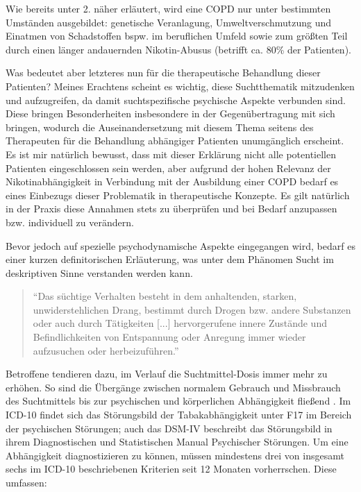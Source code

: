 Wie bereits unter 2. näher erläutert, wird eine COPD nur unter bestimmten Umständen ausgebildet: genetische Veranlagung, Umweltverschmutzung und Einatmen von Schadstoffen bspw. im beruflichen Umfeld sowie zum größten Teil durch einen länger andauernden Nikotin-Abusus (betrifft ca. 80\% der Patienten). 

Was bedeutet aber letzteres nun für die therapeutische Behandlung dieser Patienten? Meines Erachtens scheint es wichtig, diese Suchtthematik mitzudenken und aufzugreifen, da damit suchtspezifische psychische Aspekte verbunden sind. Diese bringen Besonderheiten insbesondere in der Gegenübertragung mit sich bringen, wodurch die Auseinandersetzung mit diesem Thema seitens des Therapeuten für die Behandlung abhängiger Patienten unumgänglich erscheint. Es ist mir natürlich bewusst, dass mit dieser Erklärung nicht alle potentiellen Patienten eingeschlossen sein werden, aber aufgrund der hohen Relevanz der Nikotinabhängigkeit in Verbindung mit der Ausbildung einer COPD bedarf es eines Einbezugs dieser Problematik in therapeutische Konzepte. Es gilt natürlich in der Praxis diese Annahmen stets zu überprüfen und bei Bedarf anzupassen bzw. individuell zu verändern.

Bevor jedoch auf spezielle psychodynamische Aspekte eingegangen wird, bedarf es einer kurzen definitorischen Erläuterung, was unter dem Phänomen Sucht im deskriptiven Sinne verstanden werden kann. 

\begin{quote}
\onehalfspacing
"`Das süchtige Verhalten besteht in dem anhaltenden, starken, unwiderstehlichen Drang, bestimmt durch Drogen bzw. andere Substanzen oder auch durch Tätigkeiten [...] hervorgerufene innere Zustände und Befindlichkeiten von Entspannung oder Anregung immer wieder aufzusuchen oder herbeizuführen."' \autocite[173]{mentzos2011} 
\end{quote}

Betroffene tendieren dazu, im Verlauf die Suchtmittel-Dosis immer mehr zu erhöhen. So sind die Übergänge zwischen normalem Gebrauch und Missbrauch des Suchtmittels bis zur psychischen und körperlichen Abhängigkeit fließend \autocite[vgl.][173]{mentzos2011}. Im ICD-10 findet sich das Störungsbild der Tabakabhängigkeit unter F17 im Bereich der psychischen Störungen; auch das DSM-IV beschreibt das Störungsbild in ihrem Diagnostischen und Statistischen Manual Psychischer Störungen. Um eine Abhängigkeit diagnostizieren zu können, müssen mindestens drei von insgesamt sechs im ICD-10 beschriebenen Kriterien seit 12 Monaten vorherrschen. Diese umfassen:

